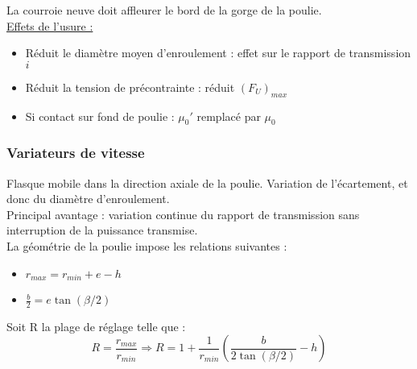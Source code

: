 \documentclass[../main.tex]{subfiles}
\begin{document}
La courroie neuve doit affleurer le bord de la gorge de la poulie.\\

\quad \underline{Effets de l'usure :}\\
\begin{itemize}
    \item Réduit le diamètre moyen d'enroulement : effet sur le rapport de transmission $i$\\
    \item Réduit la tension de précontrainte : réduit $(F_U)_{max}$\\
    \item Si contact sur fond de poulie : $\mu_0'$ remplacé par $\mu_0$\\
\end{itemize}

\subsubsection{Variateurs de vitesse}
Flasque mobile dans la direction axiale de la poulie. Variation de l'écartement, et donc du diamètre d'enroulement. \\
Principal avantage : variation continue du rapport de transmission sans interruption de la puissance transmise.\\

La géométrie de la poulie impose les relations suivantes : \begin{itemize}
    \item $r_{max} = r_{min} + e - h$\\
    \item $\frac{b}{2} = e \tan( \beta/2)$\\
\end{itemize}
Soit R la plage de réglage telle que : \begin{equation}
    R = \frac{r_{max}}{r_{min}} \Rightarrow R = 1+ \frac{1}{r_{min}} (\frac{b}{2\tan(\beta/2)}-h)
\end{equation}
\end{document}
